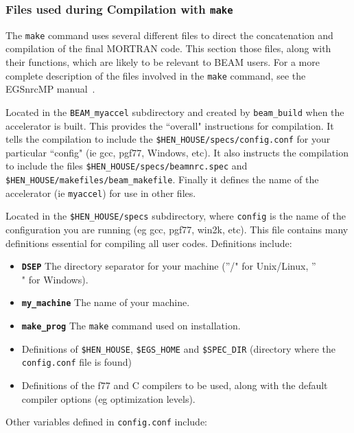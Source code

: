 \documentclass[12pt,twoside]{article}
\begin{document}
\subsubsection{Files used during Compilation with {\tt make}}
\label{makefilesect}

The {\tt make} command uses several different files to direct the
concatenation and compilation of the final MORTRAN code.  This section
those files, along with their functions, which are likely to be relevant
to BEAM users.  For a more complete description of the files involved in
the {\tt make} command, see the EGSnrcMP manual~\cite{Ka03}.

\begin{description}
\item [{\tt Makefile}] Located in the {\tt BEAM\_myaccel} subdirectory
and created by {\tt beam\_build} when the accelerator is built.
This provides the ``overall" instructions for compilation.
It tells the compilation to include the {\tt \$HEN\_HOUSE/specs/config.conf}
for your particular ``config" (ie gcc, pgf77, Windows, etc).  It also
instructs the compilation to include the files {\tt \$HEN\_HOUSE/specs/beamnrc.spec} and {\tt \$HEN\_HOUSE/makefiles/beam\_makefile}.  Finally it defines
the name of the accelerator (ie {\tt myaccel}) for use in other files.
\item [{\tt config.conf}] Located in the {\tt \$HEN\_HOUSE/specs} subdirectory,
where {\tt config} is the name of the configuration you are running
(eg gcc, pgf77, win2k, etc).  This file contains many
definitions essential for compiling all user
codes.  Definitions include:
\begin{itemize}
\item {\bf \tt DSEP} The directory separator for your machine
(''/" for Unix/Linux, ''\\" for Windows).
\item {\bf \tt my\_machine} The name of your machine.
\item {\bf \tt make\_prog} The {\tt make} command used on installation.
\item Definitions of {\tt \$HEN\_HOUSE}, {\tt \$EGS\_HOME} and
     {\tt \$SPEC\_DIR} (directory where the {\tt config.conf} file is
found)
\item Definitions of the f77 and C compilers
to be used, along with the default compiler options (eg optimization levels).
\end{itemize}
Other variables defined in {\tt config.conf} include:

\end{description}
\end{document}
